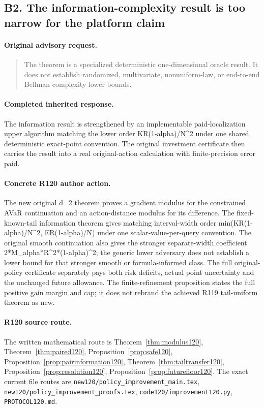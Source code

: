 \subsection{B2. The information-complexity result is too narrow for the platform claim}
\label{response120:B2}
\paragraph{Original advisory request.}
\begin{quote}
The theorem is a specialized deterministic one-dimensional oracle result. It does not establish randomized, multivariate, nonuniform-law, or end-to-end Bellman complexity lower bounds.
\end{quote}
\paragraph{Completed inherited response.}
The information result is strengthened by an implementable paid-localization upper algorithm matching the lower order KR(1-alpha)/N\textasciicircum{}2 under one shared deterministic exact-point convention. The original investment certificate then carries the result into a real original-action calculation with finite-precision error paid.
\paragraph{Concrete R120 author action.}
The new original d=2 theorem proves a gradient modulus for the constrained AVaR continuation and an action-distance modulus for its difference. The fixed-known-tail information theorem gives matching interval-width order min(KR(1-alpha)/N\textasciicircum{}2, ER(1-alpha)/N) under one scalar-value-per-query convention. The original smooth continuation also gives the stronger separate-width coefficient 2*M\_alpha*R\textasciicircum{}2*(1-alpha)\textasciicircum{}2; the generic lower adversary does not establish a lower bound for that stronger smooth or formula-informed class. The full original-policy certificate separately pays both risk deficits, actual point uncertainty and the unchanged future allowance. The finite-refinement proposition states the full positive gain margin and cap; it does not rebrand the achieved R119 tail-uniform theorem as new.
\paragraph{R120 source route.}
The written mathematical route is Theorem~\ref{thm:modulus120}, Theorem~\ref{thm:paired120}, Proposition~\ref{prop:safe120}, Proposition~\ref{prop:pairinformation120}, Theorem~\ref{thm:tailtransfer120}, Proposition~\ref{prop:resolution120}, Proposition~\ref{prop:futurefloor120}. The exact current file routes are \nolinkurl{new120/policy_improvement_main.tex}, \nolinkurl{new120/policy_improvement_proofs.tex}, \nolinkurl{code120/improvement120.py}, \nolinkurl{PROTOCOL120.md}.
